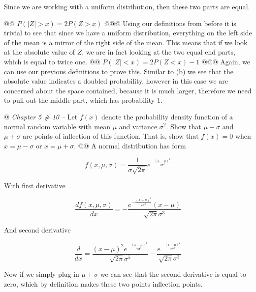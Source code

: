 \documentclass[10pt]{article}
\begin{document}
\begin{easylist}[enumerate]
    Since we are working with a uniform distribution, then these two parts are equal.

    @@ $P(|Z| > x) = 2P(Z > x)$
    @@@ Using our definitions from before it is trivial to see that since we have a uniform distribution, everything on
    the left side of the mean is a mirror of the right side of the mean. This means that if we look at the absolute
    value of $Z$, we are in fact looking at the two equal end parts, which is equal to twice one.
    @@ $P(|Z| < x) = 2P(Z < x) - 1$
    @@@ Again, we can use our previous definitions to prove this. Similar to (b) we see that the absolute value
    indicates a doubled probability, however in this case we are concerned about the space contained, because it is much
    larger, therefore we need to pull out the middle part, which has probability 1.

    @ \textit{Chapter 5 \# 10 --} Let $f(x)$ denote the probability density function of a normal random variable with
    mean $\mu$ and variance $\sigma^2$. Show that $\mu - \sigma$ and $\mu + \sigma$ are points of inflection of this
    function. That is, show that $f(x) = 0$ when $x = \mu - \sigma$ or $x = \mu + \sigma$.
    @@ A normal distribution has form

    \[ f(x, \mu, \sigma) = \frac{1}{\sigma\sqrt{2\pi} } e^{ -\frac{(x-\mu)^2}{2\sigma^2} } \]

    With first derivative

    \[ \frac{df(x, \mu, \sigma)}{dx} = -\frac{e^{-\frac{ {(x - \mu)}^2}{2 \sigma^2} } (x - \mu)}{\sqrt{2 \pi} \sigma^3} \]

    And second derivative

    \[ \frac{d}{dx} = \frac{(x-\mu )^2 e^{-\frac{(x-\mu )^2}{2 \sigma ^2} } }{\sqrt{2 \pi } \sigma ^5}-
                        \frac{e^{-\frac{(x-\mu )^2}{2 \sigma^2} } }{\sqrt{2 \pi } \sigma ^3} \]

    Now if we simply plug in $\mu \pm \sigma$ we can see that the second derivative is equal to zero, which by
    definition makes these two points inflection points.
\end{easylist}
\end{document}

